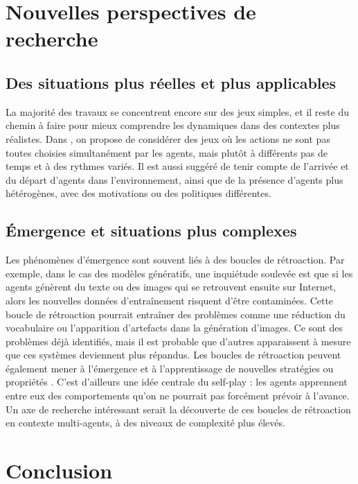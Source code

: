 \documentclass{article}
\theoremstyle{definition}
\begin{document}
\section{Nouvelles perspectives de recherche}
\subsection{Des situations plus réelles et plus applicables}
La majorité des travaux se concentrent encore sur des jeux simples, et il reste du chemin à faire pour mieux comprendre les dynamiques dans des contextes plus réalistes. Dans \citet{hernandez-leal_survey_2019}, on propose de considérer des jeux où les actions ne sont pas toutes choisies simultanément par les agents, mais plutôt à différents pas de temps et à des rythmes variés. Il est aussi suggéré de tenir compte de l’arrivée et du départ d’agents dans l’environnement, ainsi que de la présence d’agents plus hétérogènes, avec des motivations ou des politiques différentes. 

\subsection{Émergence et situations plus complexes}
Les phénomènes d’émergence sont souvent liés à des boucles de rétroaction. Par exemple, dans le cas des modèles génératifs, une inquiétude soulevée est que si les agents génèrent du texte ou des images qui se retrouvent ensuite sur Internet, alors les nouvelles données d'entraînement risquent d’être contaminées. Cette boucle de rétroaction pourrait entraîner des problèmes comme une réduction du vocabulaire ou l’apparition d’artefacts dans la génération d’images. Ce sont des problèmes déjà identifiés, mais il est probable que d’autres apparaissent à mesure que ces systèmes deviennent plus répandus.
Les boucles de rétroaction peuvent également mener à l’émergence et à l’apprentissage de nouvelles stratégies ou propriétés \citet{baker_emergent_2020}. C’est d’ailleurs une idée centrale du self-play : les agents apprennent entre eux des comportements qu’on ne pourrait pas forcément prévoir à l’avance. Un axe de recherche intéressant serait la découverte de ces boucles de rétroaction en contexte multi-agents, à des niveaux de complexité plus élevés.

\section{Conclusion}
\end{document}
